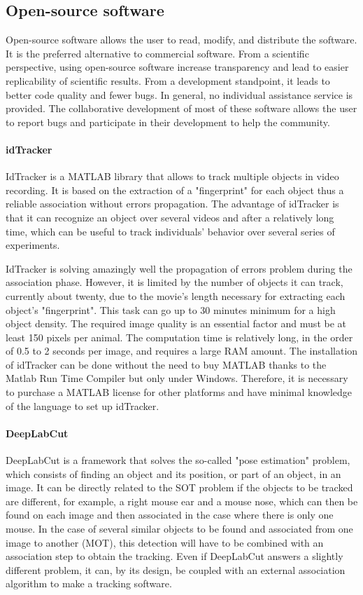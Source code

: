     \subsection{Open-source software}
    Open-source software allows the user to read, modify, and distribute the software. It is the preferred alternative to commercial software. From a scientific perspective, using open-source software increase transparency and lead to easier replicability of scientific results. From a development standpoint, it leads to better code quality and fewer bugs.
    In general, no individual assistance service is provided. The collaborative development of most of these software allows the user to report bugs and participate in their development to help the community.

    \paragraph{idTracker}
    IdTracker \cite{perez2014idtracker} is a MATLAB library that allows to track multiple objects in video recording. It is based on the extraction of a "fingerprint" for each object thus a reliable association without errors propagation. The advantage of idTracker is that it can recognize an object over several videos and after a relatively long time, which can be useful to track individuals' behavior over several series of experiments.

    IdTracker is solving amazingly well the propagation of errors problem during the association phase. However, it is limited by the number of objects it can track, currently about twenty, due to the movie's length necessary for extracting each object's "fingerprint". This task can go up to 30 minutes minimum for a high object density. The required image quality is an essential factor and must be at least 150 pixels per animal. The computation time is relatively long, in the order of 0.5 to 2 seconds per image, and requires a large RAM amount. The installation of idTracker can be done without the need to buy MATLAB thanks to the Matlab Run Time Compiler but only under Windows. Therefore, it is necessary to purchase a MATLAB license for other platforms and have minimal knowledge of the language to set up idTracker.

    \paragraph{DeepLabCut}
    DeepLabCut \cite{mathis2018deeplabcut} is a framework that solves the so-called "pose estimation" problem, which consists of finding an object and its position, or part of an object, in an image. It can be directly related to the SOT problem if the objects to be tracked are different, for example, a right mouse ear and a mouse nose, which can then be found on each image and then associated in the case where there is only one mouse. In the case of several similar objects to be found and associated from one image to another (MOT), this detection will have to be combined with an association step to obtain the tracking. Even if DeepLabCut answers a slightly different problem, it can, by its design, be coupled with an external association algorithm to make a tracking software.

